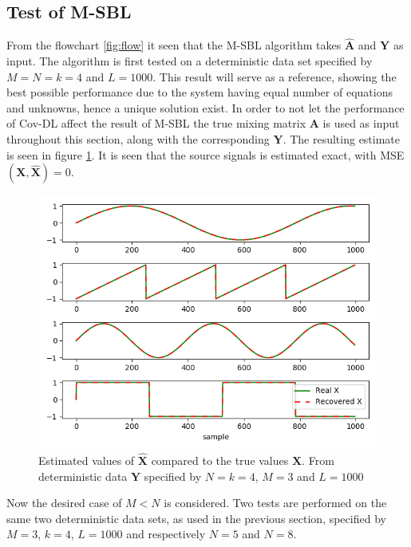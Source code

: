 \subsection{Test of M-SBL}
From the flowchart \ref{fig:flow} it seen that the M-SBL algorithm takes $\hat{\mathbf{A}}$ and $\mathbf{Y}$ as input.
The algorithm is first tested on a deterministic data set specified by $M=N=k=4$ and $L=1000$. This result will serve as a reference, showing the best possible performance due to the system having equal number of equations and unknowns, hence a unique solution exist.
In order to not let the performance of Cov-DL affect the result of M-SBL the true mixing matrix $\mathbf{A}$ is used as input throughout this section, along with the corresponding $\mathbf{Y}$. 
The resulting estimate is seen in figure \ref{fig:M-SBL_simple0}. It is seen that the source signals is estimated exact, with MSE$(\textbf{X},\hat{\textbf{X}})= 0$. 
\begin{figure}[H]
\centering
\includegraphics[scale=0.5]{figures/ch_6/M-SBL_simple0.png}
\caption{Estimated values of $\hat{\textbf{X}}$ compared to the true values $\textbf{X}$. From deterministic data $\textbf{Y}$ specified by $N=k=4$, $M = 3$ and $L=1000$}
\label{fig:M-SBL_simple0}
\end{figure}
\noindent
Now the desired case of $M<N$ is considered. Two tests are performed on the same two deterministic data sets, as used in the previous section, specified by $M = 3$, $k = 4$, $L=1000$ and respectively $N = 5$ and $N = 8$.

